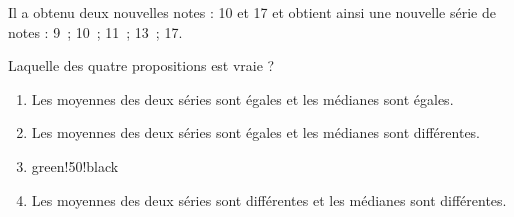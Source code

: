 \documentclass[10pt]{article}
\begin{document}
	Il a obtenu deux nouvelles notes : 10 et 17 et obtient ainsi une nouvelle série de notes : 9~; 10~; 11~; 13~; 17.
	
	Laquelle des quatre propositions est vraie ?
	
	\begin{enumerate}[label=\textbf{\alph* .}]
	\item Les moyennes des deux séries sont égales et les médianes sont égales.
	\item Les moyennes des deux séries sont égales et les médianes sont différentes.
	\item \begin{color}{green!50!black}\end{color}
	\item Les moyennes des deux séries sont différentes et les médianes sont différentes.
	\end{enumerate}
\end{document}
